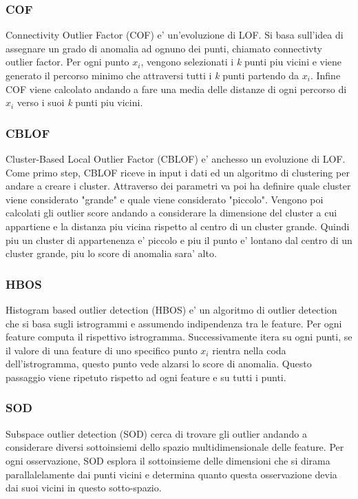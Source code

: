 \subsubsection{COF}
Connectivity Outlier Factor (COF) e' un'evoluzione di LOF. Si basa sull'idea di assegnare un grado di anomalia ad ognuno dei punti, chiamato connectivty outlier factor.
Per ogni punto $x_i$, vengono selezionati i \textit{k} punti piu vicini e viene generato il percorso minimo che attraversi tutti i \textit{k} punti partendo da $x_i$. Infine COF viene calcolato andando a fare una media delle distanze di ogni percorso di $x_i$ verso i suoi \textit{k} punti piu vicini.

\subsubsection{CBLOF}
Cluster-Based Local Outlier Factor (CBLOF) e' anchesso un evoluzione di LOF.
Come primo step, CBLOF riceve in input i dati ed un algoritmo di clustering per andare a creare i cluster. Attraverso dei parametri va poi ha definire quale cluster viene considerato "grande" e quale viene considerato "piccolo". Vengono poi calcolati gli outlier score andando a considerare la dimensione del cluster a cui appartiene e la distanza piu vicina rispetto al centro di un cluster grande. Quindi piu un cluster di appartenenza e' piccolo e piu il punto e' lontano dal centro di un cluster grande, piu lo score di anomalia sara' alto. 

\subsubsection{HBOS}
Histogram based outlier detection (HBOS) e' un algoritmo di outlier detection che si basa sugli istrogrammi e assumendo indipendenza tra le feature. Per ogni feature computa il rispettivo istrogramma. Successivamente itera su ogni punti, se il valore di una feature di uno specifico punto $x_i$ rientra nella coda dell'istrogramma, questo punto vede alzarsi lo score di anomalia. Questo passaggio viene ripetuto rispetto ad ogni feature e su tutti i punti.

\subsubsection{SOD}
Subspace outlier detection (SOD) cerca di trovare gli outlier andando a considerare diversi sottoinsiemi dello spazio multidimensionale delle feature. Per ogni osservazione, SOD esplora il sottoinsieme delle dimensioni che si dirama parallalelamente dai punti vicini e determina quanto questa osservazione devia dai suoi vicini in questo sotto-spazio. 

